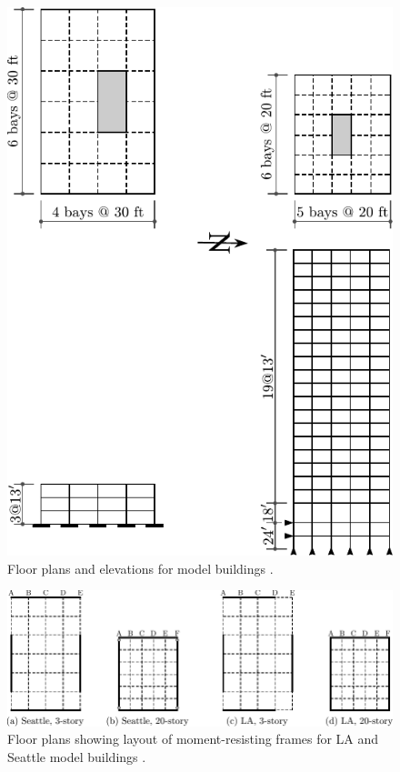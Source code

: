 \documentclass{simcenterdocumentation}
\newcommand{\kips}{\ensuremath{\,\mathrm{kips}}}
\begin{document}
%

\begin{figure}[H]
	\centering \includegraphics[width=0.45\linewidth]{SAC_floor_plans.pdf}
	\caption{Floor plans and elevations for model buildings \cite{FEMA335c2000}.}
	\label{fig:floor_plan_elev}
\end{figure}


\begin{figure}[H]
	\centering \includegraphics[width=0.8\linewidth]{SAC_moment_frame_LASE.pdf}
	\caption{Floor plans showing layout of moment-resisting frames for LA and Seattle model buildings \cite{FEMA335c2000}.}
	\label{fig:MRF_LASE}
\end{figure}
\end{document}
